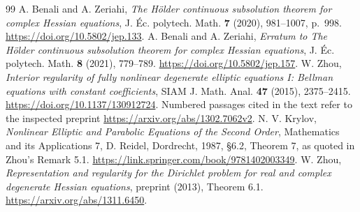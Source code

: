 \documentclass[11pt,a4paper]{article}
\theoremstyle{remark}
\begin{document}
\begingroup\small
\begin{thebibliography}{99}
 A. Benali and A. Zeriahi, \emph{The H\"older continuous subsolution theorem for complex Hessian equations}, J. \'Ec. polytech. Math. \textbf{7} (2020), 981--1007, p.~998. \url{https://doi.org/10.5802/jep.133}.
 A. Benali and A. Zeriahi, \emph{Erratum to The H\"older continuous subsolution theorem for complex Hessian equations}, J. \'Ec. polytech. Math. \textbf{8} (2021), 779--789. \url{https://doi.org/10.5802/jep.157}.
 W. Zhou, \emph{Interior regularity of fully nonlinear degenerate elliptic equations I: Bellman equations with constant coefficients}, SIAM J. Math. Anal. \textbf{47} (2015), 2375--2415. \url{https://doi.org/10.1137/130912724}. Numbered passages cited in the text refer to the inspected preprint \url{https://arxiv.org/abs/1302.7062v2}.
 N. V. Krylov, \emph{Nonlinear Elliptic and Parabolic Equations of the Second Order}, Mathematics and its Applications 7, D. Reidel, Dordrecht, 1987, \S6.2, Theorem 7, as quoted in Zhou's Remark 5.1. \url{https://link.springer.com/book/9781402003349}.
 W. Zhou, \emph{Representation and regularity for the Dirichlet problem for real and complex degenerate Hessian equations}, preprint (2013), Theorem 6.1. \url{https://arxiv.org/abs/1311.6450}.
\end{thebibliography}
\endgroup
\end{document}
